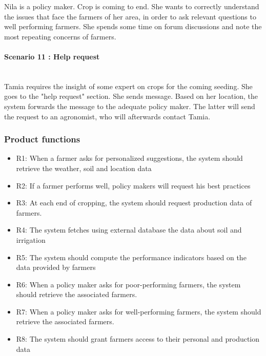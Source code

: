 Nila is a policy maker. Crop is coming to end. She wants to correctly understand the issues that face the farmers of her area, in order to ask relevant questions to well performing farmers. She spends some time on forum discussions and note the most repeating concerns of farmers.

\paragraph{Scenario 11 : Help request}\mbox{} \\

Tamia requires the insight of some expert on crops for the coming seeding. She goes to the "help request" section. She sends message. Based on her location, the system forwards the message to the adequate policy maker. The latter will send the request to an agronomist, who will afterwards contact Tamia.

\subsubsection{Product functions}

\begin{itemize}
	\item
	R1: When a farmer asks for personalized suggestions, the system should retrieve the weather, soil and location data
	\item
	R2: If a farmer performs well, policy makers will request his best practices
	\item
	R3: At each end of cropping, the system should request production data of farmers.
	\item
	R4: The system fetches using external database the data about soil and irrigation
	\item
	R5: The system should compute the performance indicators based on the data provided by farmers
	\item
	R6: When a policy maker asks for poor-performing farmers, the system should retrieve the associated farmers.
	\item
	R7: When a policy maker asks for well-performing farmers, the system should retrieve the associated farmers.
	\item
	R8: The system should grant farmers access to their personal and production data
\end{itemize}

